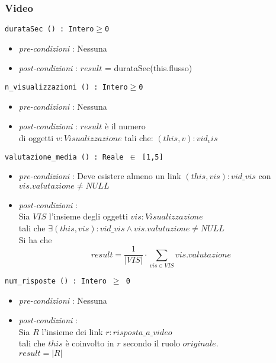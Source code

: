 \documentclass[12pt, letterpaper]{article}
\newcommand{\code}[1]{\colorbox{light-gray}{\texttt{#1}}}
\newcommand{\id}{{\hphantom{ident}}}
\begin{document}
\subsubsection{Video}
\code{durataSec () : Intero$\ge$0}\begin{itemize}
    \item \textit{pre-condizioni} : Nessuna
    \item \textit{post-condizioni} : $result$ = durataSec(this.flusso)
\end{itemize}
\code{n\_visualizzazioni () : Intero$\ge$0}\begin{itemize}
    \item \textit{pre-condizioni} : Nessuna
    \item \textit{post-condizioni} : $result$ è il numero \\di oggetti $v:Visualizzazione$ tali che:
    $(this, v): vid_vis$
\end{itemize}
\code{valutazione\_media () : Reale $\in$ [1,5]}\begin{itemize}
    \item \textit{pre-condizioni} : Deve esistere almeno un link $(this,vis):vid\_vis$ con $vis.valutazione\ne NULL$
    \item \textit{post-condizioni} :\\
    \id Sia $VIS$ l'insieme degli oggetti $vis:Visualizzazione$ 
    \\\id tali che $\exists(this,vis):vid\_vis\land vis.valutazione\ne NULL$\\ 
    \id Si ha che $$ result = \dfrac{1}{|VIS|}\cdot \sum_{vis\in VIS}vis.valutazione$$
\end{itemize}
\code{num\_risposte () : Intero $\ge$ 0}\begin{itemize}
    \item \textit{pre-condizioni} : Nessuna
    \item  \textit{post-condizioni} :\\ 
    \id  Sia $R$ l'insieme dei link $r:risposta\_a\_video$\\ 
    \id tali che $this$ è coinvolto in $r$ secondo il ruolo $originale$.\\ 
    \id $result = |R|$
\end{itemize}
\newpage 
\end{document}
